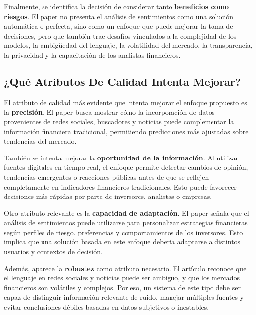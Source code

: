 \vspace{2mm}

Finalmente, se identifica la decisión de considerar tanto \textbf{beneficios como riesgos}. El paper no presenta el análisis de sentimientos como una solución automática o perfecta, sino como un enfoque que puede mejorar la toma de decisiones, pero que también trae desafíos vinculados a la complejidad de los modelos, la ambigüedad del lenguaje, la volatilidad del mercado, la transparencia, la privacidad y la capacitación de los analistas financieros.


\subsection{¿Qué Atributos De Calidad Intenta Mejorar?}
\vspace{2mm}

El atributo de calidad más evidente que intenta mejorar el enfoque propuesto es la \textbf{precisión}. El paper busca mostrar cómo la incorporación de datos provenientes de redes sociales, buscadores y noticias puede complementar la información financiera tradicional, permitiendo predicciones más ajustadas sobre tendencias del mercado.

\vspace{2mm}

También se intenta mejorar la \textbf{oportunidad de la información}. Al utilizar fuentes digitales en tiempo real, el enfoque permite detectar cambios de opinión, tendencias emergentes o reacciones públicas antes de que se reflejen completamente en indicadores financieros tradicionales. Esto puede favorecer decisiones más rápidas por parte de inversores, analistas o empresas.

\vspace{2mm}

Otro atributo relevante es la \textbf{capacidad de adaptación}. El paper señala que el análisis de sentimientos puede utilizarse para personalizar estrategias financieras según perfiles de riesgo, preferencias y comportamientos de los inversores. Esto implica que una solución basada en este enfoque debería adaptarse a distintos usuarios y contextos de decisión.

\vspace{2mm}

Además, aparece la \textbf{robustez} como atributo necesario. El artículo reconoce que el lenguaje en redes sociales y noticias puede ser ambiguo, y que los mercados financieros son volátiles y complejos. Por eso, un sistema de este tipo debe ser capaz de distinguir información relevante de ruido, manejar múltiples fuentes y evitar conclusiones débiles basadas en datos subjetivos o inestables.

